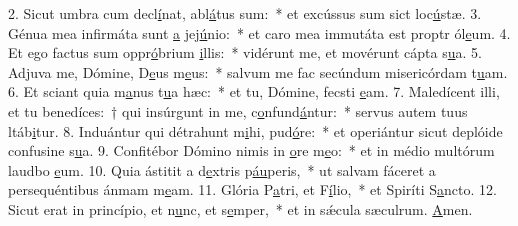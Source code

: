 2. Sicut umbra cum decl\uline{í}nat, abl\uline{á}tus sum:~* et excússus sum sict loc\uline{ú}stæ.
3. Génua mea infirmáta sunt \uline{a} jej\uline{ú}nio:~* et caro mea immutáta est proptr ól\uline{e}um.
4. Et ego factus sum oppr\uline{ó}brium \uline{i}llis:~* vidérunt me, et movérunt cápta s\uline{u}a.
5. Adjuva me, Dómine, D\uline{e}us m\uline{e}us:~* salvum me fac secúndum misericórdam t\uline{u}am.
6. Et sciant quia m\uline{a}nus t\uline{u}a hæc:~* et tu, Dómine, fecsti \uline{e}am.
7. Maledícent illi, et tu benedíces:~† qui insúrgunt in me, c\uline{o}nfund\uline{á}ntur:~* servus autem tuus ltáb\uline{i}tur.
8. Induántur qui détrahunt m\uline{i}hi, pud\uline{ó}re:~* et operiántur sicut deplóide confusine s\uline{u}a.
9. Confitébor Dómino nimis in \uline{o}re m\uline{e}o:~* et in médio multórum laudbo \uline{e}um.
10. Quia ástitit a d\uline{e}xtris p\uline{áu}peris,~* ut salvam fáceret a persequéntibus ánmam m\uline{e}am.
11. Glória P\uline{a}tri, et F\uline{í}lio,~* et Spiríti S\uline{a}ncto.
12. Sicut erat in princípio, et n\uline{u}nc, et s\uline{e}mper,~* et in sǽcula sæculrum. \uline{A}men.
